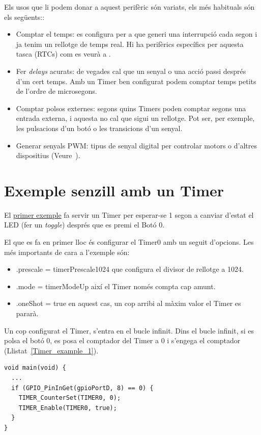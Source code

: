 Els usos que li podem donar a aquest perifèric són variats, els més habituals són els següents::
\begin{itemize}
 \item Comptar el temps: es configura per a que generi una interrupció cada segon i ja tenim un rellotge de temps real. Hi ha perifèrics específics per aquesta tasca (\glspl{RTC}) com es veurà a .
 \item Fer {\em delays} acurats: de vegades cal que un senyal o una acció passi després d'un cert temps. Amb un Timer ben configurat podem comptar temps petits de l'ordre de microsegons.
 \item Comptar polsos externes: segons quins Timers poden comptar segons una entrada externa, i aquesta no cal que sigui un rellotge. Pot ser, per exemple, les pulsacions d'un botó o les transicions d'un senyal.
 \item Generar senyals \gls{PWM}: tipus de senyal digital per controlar motors o d'altres dispositius (Veure~{}).
\end{itemize}

\section{Exemple senzill amb un Timer}
\label{sub:Timers_exemple}
El \href{https://github.com/mariusmm/cursembedded/tree/master/Simplicity/Timer_1}{primer exemple} fa servir un Timer per esperar-se 1 segon a canviar d'estat el LED (fer un {\em toggle}) després que es premi el Botó 0.

El que es fa en primer lloc és configurar el Timer0 amb un seguit d'opcions. Les més importants de cara a l'exemple són:
\begin{itemize}
 \item .prescale = timerPrescale1024 que configura el divisor de rellotge a 1024.
 \item .mode = timerModeUp així el Timer només compta cap amunt.
 \item .oneShot = true en aquest cas, un cop arribi al màxim valor el Timer es pararà.
\end{itemize}

Un cop configurat el Timer, s'entra en el bucle infinit.
Dins el bucle infinit, si es polsa el botó 0, es posa el comptador del Timer a 0 i s'engega el comptador (Llistat~\ref{Timer_example_1}).
\begin{lstlisting}[style=customc, label=Timer_example_1, caption=Codi d'exemple d'ús d'un Timer ]
void main(void) {
  ...
  if (GPIO_PinInGet(gpioPortD, 8) == 0) {
    TIMER_CounterSet(TIMER0, 0);
    TIMER_Enable(TIMER0, true);
  }
}
\end{lstlisting}

